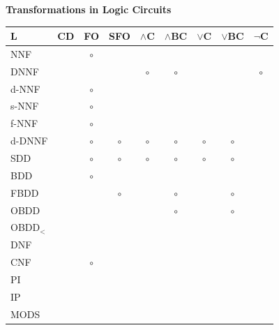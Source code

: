 \documentclass[aspectratio=169]{beamer}
\newcommand{\cmark}{\color{rightgreen}\ding{51}}%
\newcommand{\xmark}{\color{wrongred}\ding{55}}%
\newcommand{\omark}{{\color{dark gray}\tiny$\bm{\circ}$}}%
\begin{document}
\begin{frame}[fragile]{\textbf{Transformations in Logic Circuits}}

\begin{center}
  \scriptsize
  \begin{minipage}{0.65\textwidth}
    \begin{tabular}{l|cccccccc}
      \textbf{L} & \textbf{CD} & \textbf{FO} & \textbf{SFO} & \textbf{$\wedge$C} &
      \textbf{$\wedge$BC} & \textbf{$\vee$C} & \textbf{$\vee$BC} & \textbf{$\neg$C}\\
      \hline
          NNF & \cmark & \omark & \cmark & \cmark & \cmark & \cmark & \cmark & \cmark\\
         DNNF & \cmark & \cmark & \cmark & \omark & \omark & \cmark & \cmark & \omark\\
        d-NNF & \cmark & \omark & \cmark & \cmark & \cmark & \cmark & \cmark & \cmark\\
        s-NNF & \cmark & \omark & \cmark & \cmark & \cmark & \cmark & \cmark & \cmark\\
        f-NNF & \cmark & \omark & \cmark & \xmark & \xmark & \xmark & \xmark & \cmark\\
       d-DNNF & \cmark & \omark & \omark & \omark & \omark & \omark & \omark & \cmark\\
          SDD & \cmark & \omark & \omark & \omark & \omark & \omark & \omark & \cmark\\
          BDD & \cmark & \omark & \cmark & \cmark & \cmark & \cmark & \cmark & \cmark\\
         FBDD & \cmark & \xmark & \omark & \xmark & \omark & \xmark & \omark & \cmark\\
         OBDD & \cmark & \xmark & \cmark & \xmark & \omark & \xmark & \omark & \cmark\\
      OBDD$_<$& \cmark & \xmark & \cmark & \xmark & \cmark & \xmark & \cmark & \cmark\\
          DNF & \cmark & \cmark & \cmark & \xmark & \cmark & \cmark & \cmark & \xmark\\
          CNF & \cmark & \omark & \cmark & \cmark & \cmark & \xmark & \cmark & \xmark\\
           PI & \cmark & \cmark & \cmark & \xmark & \xmark & \xmark & \cmark & \xmark\\
           IP & \cmark & \xmark & \xmark & \xmark & \cmark & \xmark & \xmark & \xmark\\
         MODS & \cmark & \cmark & \cmark & \xmark & \cmark & \xmark & \xmark & \xmark\\

\end{tabular}
\end{minipage}
\end{center}
\end{frame}
\end{document}
